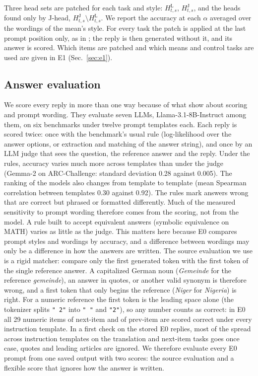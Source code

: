 \documentclass[11pt,a4paper]{article}
\begin{document}
Three head sets are patched for each task and style: $H^{\mathrm{L}}_{t,s}$, $H^{\mathrm{J}}_{t,s}$, and the heads found only by J-head, $H^{\mathrm{J}}_{t,s}\setminus H^{\mathrm{L}}_{t,s}$. We report the accuracy at each $\alpha$ averaged over the wordings of the mean's style.
For every task the patch is applied at the last prompt position only, as in \citet{yang2026shared}; the reply is then generated without it, and its answer is scored.
Which items are patched and which means and control tasks are used are given in E1 (Sec.~\ref{sec:e1}).

\subsection{Answer evaluation}\label{sec:evaluation}
We score every reply in more than one way because of what \citet{hua2025flaw} show about scoring and prompt wording. They evaluate seven LLMs, Llama-3.1-8B-Instruct among them, on six benchmarks under twelve prompt templates each. Each reply is scored twice: once with the benchmark's usual rule (log-likelihood over the answer options, or extraction and matching of the answer string), and once by an LLM judge that sees the question, the reference answer and the reply. Under the rules, accuracy varies much more across templates than under the judge (Gemma-2 on ARC-Challenge: standard deviation 0.28 against 0.005). The ranking of the models also changes from template to template (mean Spearman correlation between templates 0.30 against 0.92). The rules mark answers wrong that are correct but phrased or formatted differently. Much of the measured sensitivity to prompt wording therefore comes from the scoring, not from the model. A rule built to accept equivalent answers (symbolic equivalence on MATH) varies as little as the judge. This matters here because E0 compares prompt styles and wordings by accuracy, and a difference between wordings may only be a difference in how the answers are written. The source evaluation we use is a rigid matcher: \citet{yang2026shared} compare only the first generated token with the first token of the single reference answer. A capitalized German noun (\emph{Gemeinde} for the reference \emph{gemeinde}), an answer in quotes, or another valid synonym is therefore wrong, and a first token that only begins the reference (\emph{Niger} for \emph{Nigeria}) is right. For a numeric reference the first token is the leading space alone (the tokenizer splits \texttt{" 2"} into \texttt{" "} and \texttt{"2"}), so any number counts as correct: in E0 all 29 numeric items of next-item and of prev-item are scored correct under every instruction template. In a first check on the stored E0 replies, most of the spread across instruction templates on the translation and next-item tasks goes once case, quotes and leading articles are ignored. We therefore evaluate every E0 prompt from one saved output with two scores: the source evaluation and a flexible score that ignores how the answer is written.
\end{document}

